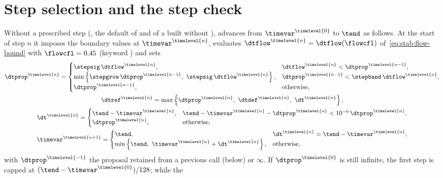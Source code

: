 \section{Step selection and the step check}\label{sec:stab:selection}
Without a prescribed step (, the default of
 and of a  built without
),  advances from $\timevar^{\timelevel{0}}$ to
$\tend$ as follows. At the start of step $n$ it imposes the boundary values
at $\timevar^{\timelevel{n}}$, evaluates
$\dtflow^{\timelevel{n}}=\dtflow(\flowcfl)$ of~\cref{eq:stab:flow-bound} with
$\flowcfl=0.45$ (keyword ) and sets
\begin{equation}\label{eq:stab:selection}
  \begin{gathered}
  {\dtprop}^{\timelevel{n}}=\begin{cases}
    \stepsig\,\dtflow^{\timelevel{n}}, & \dtflow^{\timelevel{n}}<{\dtprop}^{\timelevel{n-1}},\\
    \min\curlypar{\stepgrow\,{\dtprop}^{\timelevel{n-1}},\ \stepsig\,\dtflow^{\timelevel{n}}},
      & {\dtprop}^{\timelevel{n-1}}<\stepband\,\dtflow^{\timelevel{n}},\\
    {\dtprop}^{\timelevel{n-1}}, & \text{otherwise},
  \end{cases}\\
  {\dtref}^{\timelevel{n}}=\max\curlypar{{\dtprop}^{\timelevel{n}},\ {\dtdef}^{\timelevel{n}},\ \dt^{\timelevel{n}}},\\
  \dt^{\timelevel{n}}=\begin{cases}
    \tend-\timevar^{\timelevel{n}}, & \tend-\timevar^{\timelevel{n}}-{\dtprop}^{\timelevel{n}}<10^{-6}\,{\dtprop}^{\timelevel{n}},\\
    {\dtprop}^{\timelevel{n}}, & \text{otherwise},
  \end{cases}\\
  \timevar^{\timelevel{n+1}}=\begin{cases}
    \tend, & \dt^{\timelevel{n}}=\tend-\timevar^{\timelevel{n}},\\
    \min\curlypar{\tend,\ \timevar^{\timelevel{n}}+\dt^{\timelevel{n}}}, & \text{otherwise},
  \end{cases}
  \end{gathered}
\end{equation}
with ${\dtprop}^{\timelevel{-1}}$ the proposal retained from a previous call
(below) or $\infty$. If ${\dtprop}^{\timelevel{0}}$ is still infinite, the
first step is capped at $(\tend-\timevar^{\timelevel{0}})/128$; while the
